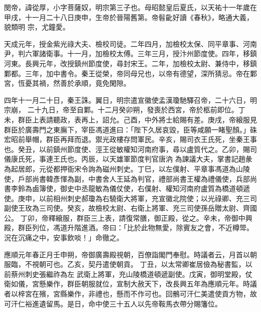 
\begin{pinyinscope}

 閔帝，諱從厚，小字菩薩奴，明宗第三子也。母昭懿皇后夏氏，以天祐十一年歲在甲戌，十一月二十八日庚申，生帝於晉陽舊第。帝髫齔好讀《春秋》，略通大義，貌類明
 宗，尤鐘愛。



 天成元年，授金紫光祿大夫、檢校司徒。二年四月，加檢校太保、同平章事、河南尹，判六軍諸衛事。十一月，加檢校太傅。三年三月，授汴州節度使。四年，移鎮河東。長興元年，改授鎮州節度使，尋封宋王。二年，加檢校太尉、兼侍中，移鎮鄴都。三年，加中書令。秦王從榮，帝同母兄也，以帝有德望，深所猜忌。帝在鄴宮，恆憂其禍，然善於承順，竟免閑隙。



 四年十一月二十日，秦王誅。翼日，明宗遣宣徽使孟漢瓊馳驛召帝，二十六日，明宗崩，
 二十九日，帝至自鄴。十二月癸卯朔，發喪於西宮，帝於柩前即位。丁未，群臣上表請聽政，表再上，詔允。己酉，中外將士給賜有差。庚戌，帝縗服見群臣於廣壽門之東廡下，宰臣馮道進曰：「陛下久居哀毀，臣等咸願一睹聖顏。」硃宏昭前舉帽，群臣再拜而退。禦光政樓存問軍民。辛亥，賜司衣王氏死，坐秦王事也。癸丑，以前鎮州節度使、涇王從敏權知河南府事，尋以盧質代之。乙卯，賜司儀康氏死，事連王氏也。丙辰，以天雄軍節度判官唐汭
 為諫議大夫，掌書記趙彖為起居郎，元從都押衙宋令詢為磁州刺史。丁巳，以左僕射、平章事馮道為山陵使，戶部尚書韓彥惲為副，中書舍人王延為判官，禮部尚書王權為禮儀使，兵部尚書李鈴為鹵簿使，御史中丞龍敏為儀仗使，右僕射、權知河南府盧質為橋道頓遞使。庚申，以前相州刺史郝瓊為右驍衛大將軍，充宣徽北院使；以光祿卿、充三司副使王玫為三司使。癸亥，故檢校太尉、右衛上將軍、充三司使孫岳贈太尉、齊國公。
 丁卯，帝釋縗服，群臣三上表，請復常膳，御正殿，從之。辛未，帝御中興殿，群臣列位，馮道升階進酒。帝曰：「比於此物無愛，除賓友之會，不近樽斝。況在沉痛之中，安事飲啖！」命徹之。


應順元年春正月壬申朔，帝御廣壽殿視朝，百僚詣閣門奉慰。時議者云，月首以朝服臨，不視朝可也。乙亥，契丹遣使朝貢。
 丁丑，以太常卿崔居儉為秘書監，以前蔡州刺史張繼祚為左
 武衛上將軍，充山陵橋道頓遞副使。戊寅，御明堂殿，仗衛如儀，宮懸樂作，群臣朝服就位，宣制大赦天下，改長興五年為應順元年。時議者以梓宮在殯，宮縣樂作，非禮也，懸而不作可也。回鶻可汗仁美遣使貢方物，故可汗仁裕進遺留馬。是日，命中使三十五人以先帝鞍馬衣帶分賜籓位。




\end{pinyinscope}
